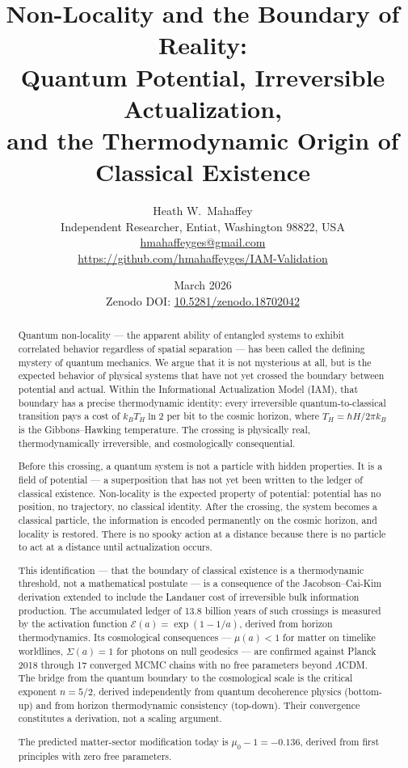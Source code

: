 \documentclass[12pt,a4paper]{article}
\title{\textbf{Non-Locality and the Boundary of Reality:\\
Quantum Potential, Irreversible Actualization,\\
and the Thermodynamic Origin of Classical Existence}}
\author{Heath W.\ Mahaffey\\
\small Independent Researcher, Entiat, Washington 98822, USA\\
\small \href{mailto:hmahaffeyges@gmail.com}{hmahaffeyges@gmail.com}\\
\small \url{https://github.com/hmahaffeyges/IAM-Validation}}
\date{March 2026\\
\small Zenodo DOI: \href{https://doi.org/10.5281/zenodo.18702042}{10.5281/zenodo.18702042}}
\begin{document}
\maketitle

\begin{abstract}
Quantum non-locality --- the apparent ability of entangled systems to
exhibit correlated behavior regardless of spatial separation --- has been
called the defining mystery of quantum mechanics. We argue that it is
not mysterious at all, but is the expected behavior of physical systems
that have not yet crossed the boundary between potential and actual.
Within the Informational Actualization Model (IAM), that boundary has
a precise thermodynamic identity: every irreversible quantum-to-classical
transition pays a cost of $k_B T_H \ln 2$ per bit to the cosmic horizon,
where $T_H = \hbar H / 2\pi k_B$ is the Gibbons--Hawking temperature.
The crossing is physically real, thermodynamically irreversible, and
cosmologically consequential.

Before this crossing, a quantum system is not a particle with hidden
properties. It is a field of potential --- a superposition that has not
yet been written to the ledger of classical existence. Non-locality is
the expected property of potential: potential has no position, no
trajectory, no classical identity. After the crossing, the system
becomes a classical particle, the information is encoded permanently
on the cosmic horizon, and locality is restored. There is no spooky
action at a distance because there is no particle to act at a distance
until actualization occurs.

This identification --- that the boundary of classical existence is a
thermodynamic threshold, not a mathematical postulate --- is a consequence
of the Jacobson--Cai-Kim derivation extended to include the Landauer cost
of irreversible bulk information production. The accumulated ledger of
13.8 billion years of such crossings is measured by the activation
function $\mathcal{E}(a) = \exp(1 - 1/a)$, derived from horizon
thermodynamics. Its cosmological consequences --- $\mu(a) < 1$ for matter
on timelike worldlines, $\Sigma(a) = 1$ for photons on null geodesics ---
are confirmed against Planck 2018 through 17 converged MCMC chains with
no free parameters beyond $\Lambda$CDM. The bridge from the quantum
boundary to the cosmological scale is the critical exponent $n = 5/2$,
derived independently from quantum decoherence physics (bottom-up) and
from horizon thermodynamic consistency (top-down). Their convergence
constitutes a derivation, not a scaling argument.

The predicted matter-sector modification today is $\mu_0 - 1 = -0.136$,
derived from first principles with zero free parameters.
\end{abstract}
\end{document}
